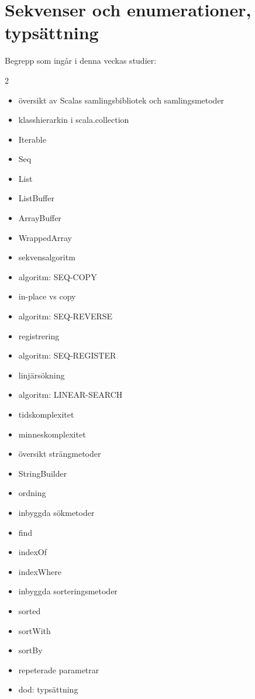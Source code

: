 \chapter{Sekvenser och enumerationer, typsättning}\label{chapter:W07}
Begrepp som ingår i denna veckas studier:
\begin{multicols}{2}\begin{itemize}[noitemsep,label={$\square$},leftmargin=*]
\item översikt av Scalas samlingsbibliotek och samlingsmetoder
\item klasshierarkin i scala.collection
\item Iterable
\item Seq
\item List
\item ListBuffer
\item ArrayBuffer
\item WrappedArray
\item sekvensalgoritm
\item algoritm: SEQ-COPY
\item in-place vs copy
\item algoritm: SEQ-REVERSE
\item registrering
\item algoritm: SEQ-REGISTER
\item linjärsökning
\item algoritm: LINEAR-SEARCH
\item tidskomplexitet
\item minneskomplexitet
\item översikt strängmetoder
\item StringBuilder
\item ordning
\item inbyggda sökmetoder
\item find
\item indexOf
\item indexWhere
\item inbyggda sorteringsmetoder
\item sorted
\item sortWith
\item sortBy
\item repeterade parametrar
\item dod: typsättning\end{itemize}\end{multicols}
